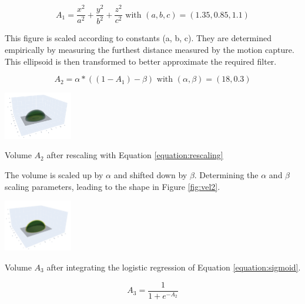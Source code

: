 \begin{equation}
    A_{1} = \frac{x^2}{a^2} +\frac{y^2}{b^2} +\frac{z^2}{c^2} \text{ with } (a, b, c) = (1.35, 0.85, 1.1)
    \label{equation:ellipsoid}
\end{equation}

This figure is scaled according to constants (a, b, c). They are determined empirically by measuring the furthest distance measured by the motion capture. This ellipsoid is then transformed to better approximate the required filter.



\begin{equation}
    A_{2} =\alpha*((1-A_{1})-\beta) \text{ with } (\alpha, \beta) = (18, 0.3) 
    \label{equation:rescaling}
\end{equation}

\begin{marginfigure}%
  \hspace{1cm}\includegraphics[width=3cm]{images/hdi_system/velocity_2_crop.png}
  \caption{Volume \(A_{2}\) after rescaling with Equation \ref{equation:rescaling}}
  \label{fig:vel2}
\end{marginfigure}

The volume is scaled up by $\alpha$ and shifted down by $\beta$.
Determining the $\alpha$ and $\beta$ scaling parameters, leading to the shape in Figure \ref{fig:vel2}.

\begin{marginfigure}%
  \hspace{1cm}\includegraphics[width=3cm]{images/hdi_system/velocity_3_crop.png}
  \caption{Volume \(A_{3}\) after integrating the logistic regression of Equation \ref{equation:sigmoid}.}
  \label{fig:vel3}
\end{marginfigure}

\begin{equation}
    A_{3} = \frac{1}{1+e^{-A_{2}}}
    \label{equation:sigmoid}
\end{equation}


